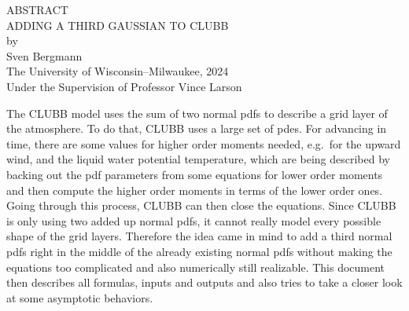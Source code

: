 \begin{center}
    ABSTRACT
    \\
    \singlespacing
    ADDING A THIRD GAUSSIAN TO CLUBB\\
    \doublespacing
    by\\
    Sven Bergmann\\
    \singlespacing
    The University of Wisconsin--Milwaukee, 2024\\
    Under the Supervision of Professor Vince Larson
\end{center}

The \gls{CLUBB} model uses the sum of two normal \glspl{pdf} to describe a grid layer of the atmosphere.
To do that, \gls{CLUBB} uses a large set of \glspl{pde}.
For advancing in time, there are some values for higher order moments needed, e.g.\ for the upward wind, and the liquid water potential temperature, which are being described by backing out the \gls{pdf} parameters from some equations for lower order moments and then compute the higher order moments in terms of the lower order ones.
Going through this process, \gls{CLUBB} can then close the equations.
Since \gls{CLUBB} is only using two added up normal \glspl{pdf}, it cannot really model every possible shape of the grid layers.
Therefore the idea came in mind to add a third normal \glspl{pdf} right in the middle of the already existing normal \glspl{pdf} without making the equations too complicated and also numerically still realizable.
This document then describes all formulas, inputs and outputs and also tries to take a closer look at some asymptotic behaviors.
